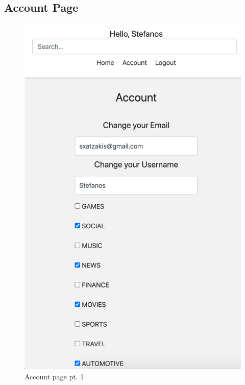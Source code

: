\subsection{Account Page}

\begin{figure}[htbp]
\begin{minipage}[t]{0.45\linewidth}
    \includegraphics[width=\linewidth]{Figures/account_1}
    \caption{Account page pt. 1}
    \label{account_1}
\end{minipage}%
    \hfill%
\begin{minipage}[t]{0.45\linewidth}

\end{minipage}
\end{figure}

